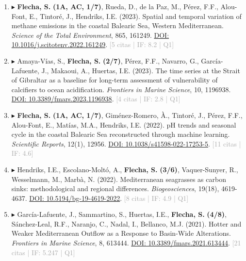 \documentclass[11pt,a4paper]{article}
\begin{document}
\begin{enumerate}[leftmargin=*]
\item $\blacktriangleright$ \textbf{Flecha, S.} \textbf{(1A, AC, 1/7)}, Rueda, D., de la Paz, M., Pérez, F.F., Alou-Font, E., Tintoré, J., Hendriks, I.E. (2023). Spatial and temporal variation of methane emissions in the coastal Balearic Sea, Western Mediterranean. \textit{Science of the Total Environment}, 865, 161249. \href{https://doi.org/10.1016/j.scitotenv.2022.161249}{DOI: 10.1016/j.scitotenv.2022.161249}. \textcolor{darkgray}{\small [5 citas | IF: 8.2 | Q1]}

\item $\blacktriangleright$ Amaya-Vías, S., \textbf{Flecha, S.} \textbf{(2/7)}, Pérez, F.F., Navarro, G., García-Lafuente, J., Makaoui, A., Huertas, I.E. (2023). The time series at the Strait of Gibraltar as a baseline for long-term assessment of vulnerability of calcifiers to ocean acidification. \textit{Frontiers in Marine Science}, 10, 1196938. \href{https://doi.org/10.3389/fmars.2023.1196938}{DOI: 10.3389/fmars.2023.1196938}. \textcolor{darkgray}{\small [4 citas | IF: 2.8 | Q1]}

\item $\blacktriangleright$ \textbf{Flecha, S.} \textbf{(1A, AC, 1/7)}, Giménez-Romero, À., Tintoré, J., Pérez, F.F., Alou-Font, E., Matías, M.A., Hendriks, I.E. (2022). pH trends and seasonal cycle in the coastal Balearic Sea reconstructed through machine learning. \textit{Scientific Reports}, 12(1), 12956. \href{https://doi.org/10.1038/s41598-022-17253-5}{DOI: 10.1038/s41598-022-17253-5}. \textcolor{darkgray}{\small [11 citas | IF: 4.6]}

\item $\blacktriangleright$ Hendriks, I.E., Escolano-Moltó, A., \textbf{Flecha, S.} \textbf{(3/6)}, Vaquer-Sunyer, R., Wesselmann, M., Marbà, N. (2022). Mediterranean seagrasses as carbon sinks: methodological and regional differences. \textit{Biogeosciences}, 19(18), 4619-4637. \href{https://doi.org/10.5194/bg-19-4619-2022}{DOI: 10.5194/bg-19-4619-2022}. \textcolor{darkgray}{\small [8 citas | IF: 4.9 | Q1]}

\item $\blacktriangleright$ García-Lafuente, J., Sammartino, S., Huertas, I.E., \textbf{Flecha, S.} \textbf{(4/8)}, Sánchez-Leal, R.F., Naranjo, C., Nadal, I., Bellanco, M.J. (2021). Hotter and Weaker Mediterranean Outflow as a Response to Basin-Wide Alterations. \textit{Frontiers in Marine Science}, 8, 613444. \href{https://doi.org/10.3389/fmars.2021.613444}{DOI: 10.3389/fmars.2021.613444}. \textcolor{darkgray}{\small [21 citas | IF: 5.247 | Q1]}


\end{enumerate}
\end{document}
